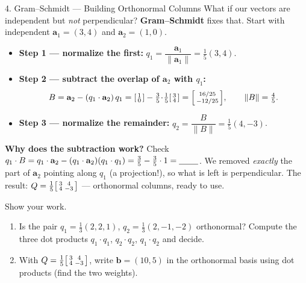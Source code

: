 \documentclass[10pt]{article}
\newcommand{\bb}{\mathbf{b}}
\newcommand{\avec}{\mathbf{a}}
\begin{document}
\begin{notesbox}{4. Gram--Schmidt --- Building Orthonormal Columns}
What if our vectors are independent but \emph{not} perpendicular? \textbf{Gram--Schmidt} fixes that. Start
with independent $\avec_1=(3,4)$ and $\avec_2=(1,0)$.
\begin{itemize}\setlength{\itemsep}{3pt}
  \item \textbf{Step 1 --- normalize the first:} $q_1=\dfrac{\avec_1}{\|\avec_1\|}=\tfrac15(3,4)$.
  \item \textbf{Step 2 --- subtract the overlap of $\avec_2$ with $q_1$:}
  \[
    B=\avec_2-(q_1\cdot\avec_2)\,q_1
     =\begin{bsmallmatrix} 1\\ 0 \end{bsmallmatrix}-\tfrac35\!\cdot\!\tfrac15\begin{bsmallmatrix} 3\\ 4 \end{bsmallmatrix}
     =\begin{bsmallmatrix} 16/25\\ -12/25 \end{bsmallmatrix},\qquad \|B\|=\tfrac{4}{5}.
  \]
  \item \textbf{Step 3 --- normalize the remainder:} $q_2=\dfrac{B}{\|B\|}=\tfrac15(4,-3)$.
\end{itemize}
\textbf{Why does the subtraction work?} Check $q_1\cdot B=q_1\cdot\avec_2-(q_1\cdot\avec_2)(q_1\cdot q_1)
=\tfrac35-\tfrac35\cdot 1=\blank{0.8cm}$. We removed \emph{exactly} the part of $\avec_2$ pointing along
$q_1$ (a projection!), so what is left is perpendicular. The result: $Q=\tfrac15\begin{bsmallmatrix} 3&4\\4&-3 \end{bsmallmatrix}$
--- orthonormal columns, ready to use.
\end{notesbox}

\begin{practicebox}
Show your work.
\begin{enumerate}[leftmargin=1.6em, itemsep=6pt]
  \item Is the pair $q_1=\tfrac13(2,2,1)$, $q_2=\tfrac13(2,-1,-2)$ orthonormal? Compute the three dot
        products $q_1\cdot q_1$, $q_2\cdot q_2$, $q_1\cdot q_2$ and decide. \writeline
  \item With $Q=\tfrac15\begin{bsmallmatrix} 3&4\\4&-3 \end{bsmallmatrix}$, write $\bb=(10,5)$ in the
        orthonormal basis using dot products (find the two weights). \writeline
\end{enumerate}
\end{practicebox}
\end{document}

